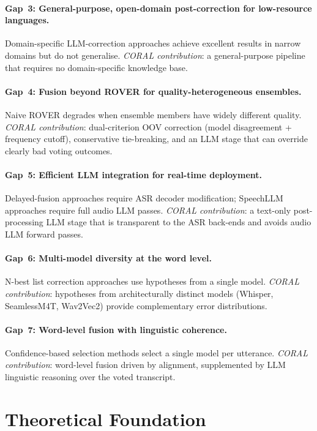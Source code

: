 \paragraph{Gap~3: General-purpose, open-domain post-correction for low-resource languages.} Domain-specific LLM-correction approaches achieve excellent results in narrow domains but do not generalise. \emph{CORAL contribution}: a general-purpose pipeline that requires no domain-specific knowledge base.

\paragraph{Gap~4: Fusion beyond ROVER for quality-heterogeneous ensembles.} Naive ROVER degrades when ensemble members have widely different quality. \emph{CORAL contribution}: dual-criterion OOV correction (model disagreement + frequency cutoff), conservative tie-breaking, and an LLM stage that can override clearly bad voting outcomes.

\paragraph{Gap~5: Efficient LLM integration for real-time deployment.} Delayed-fusion approaches require ASR decoder modification; SpeechLLM approaches require full audio LLM passes. \emph{CORAL contribution}: a text-only post-processing LLM stage that is transparent to the ASR back-ends and avoids audio LLM forward passes.

\paragraph{Gap~6: Multi-model diversity at the word level.} N-best list correction approaches use hypotheses from a single model. \emph{CORAL contribution}: hypotheses from architecturally distinct models (Whisper, SeamlessM4T, Wav2Vec2) provide complementary error distributions.

\paragraph{Gap~7: Word-level fusion with linguistic coherence.} Confidence-based selection methods select a single model per utterance. \emph{CORAL contribution}: word-level fusion driven by alignment, supplemented by LLM linguistic reasoning over the voted transcript.

\section{Theoretical Foundation}
\label{sec:theory}

